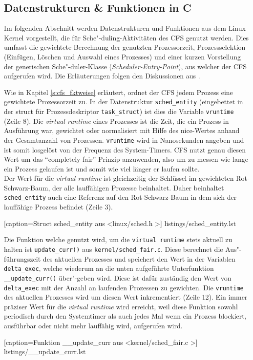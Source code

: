\subsection{Datenstrukturen \& Funktionen in C}\label{s:cstructs}
Im folgenden Abschnitt werden Datenstrukturen und Funktionen aus dem Linux-Kernel vorgestellt, die für Sche"-duling-Aktivitäten des CFS genutzt werden. Dies umfasst die gewichtete Berechnung der genutzten Prozessorzeit, Prozessselektion (Einfügen, Löschen und Auswahl eines Prozesses) und einer kurzen Vorstellung der generischen Sche"-duler-Klasse (\textit{Scheduler-Entry-Point}), aus welcher der CFS aufgerufen wird. Die Erläuterungen folgen den Diskussionen aus \cite{rlove}.

Wie in Kapitel \ref{s:cfs_fktweise} erläutert, ordnet der CFS jedem Prozess eine gewichtete Prozessorzeit zu. In der Datenstruktur \texttt{sched\_entity} (eingebettet in der struct für Prozessdeskriptor \texttt{task\_struct}) ist dies die Variable \texttt{vruntime} (Zeile 8). Die \textit{virtual runtime} eines Prozesses ist die Zeit, die ein Prozess in Ausführung war, gewichtet oder normalisiert mit Hilfe des nice-Wertes anhand der Gesamtanzahl von Prozessen. \texttt{vruntime} wird in Nanosekunden angeben und ist somit losgelöst von der Frequenz des System-Timers. CFS nutzt genau diesen Wert um das ``completely fair'' Prinzip anzuwenden, also um zu messen wie lange ein Prozess gelaufen ist und somit wie viel länger er laufen sollte. \\
Der Wert für die \textit{virtual runtime} ist gleichzeitig der Schlüssel im gewichteten Rot-Schwarz-Baum, der alle lauffähigen Prozesse beinhaltet. Daher beinhaltet \texttt{sched\_entity} auch eine Referenz auf den Rot-Schwarz-Baum in dem sich der lauffähige Prozess befindet (Zeile 3).

[caption={Struct sched\_entity aus \textless linux/sched.h \textgreater}]
{listings/sched_entity.lst}

Die Funktion welche genutzt wird, um die  \texttt{virtual \- runtime} stets aktuell zu halten ist \texttt{update\_curr()} aus \texttt{kernel/sched\_fair.c}. Diese berechnet die Aus"-führungszeit des aktuellen Prozesses und speichert den Wert in der Variablen \texttt{delta\_exec}, welche wiederum an die unten aufgeführte Unterfunktion \texttt{\_\_update\_curr()} über"-geben wird. Diese ist dafür zuständig den Wert von \texttt{delta\-\_exec} mit der Anzahl an laufenden Prozessen zu gewichten. Die \texttt{vruntime} des aktuellen Prozesses wird um diesen Wert inkrementiert (Zeile 12). Ein immer präziser Wert für die \textit{virtual runtime} wird erreicht, weil diese Funktion sowohl periodisch durch den Systemtimer als auch jedes Mal wenn ein Prozess blockiert, ausführbar oder nicht mehr lauffähig wird, aufgerufen wird. 

 [caption={Funktion \_\_update\_curr aus \textless kernel/sched\_fair.c \textgreater}]
{listings/__update_curr.lst}

